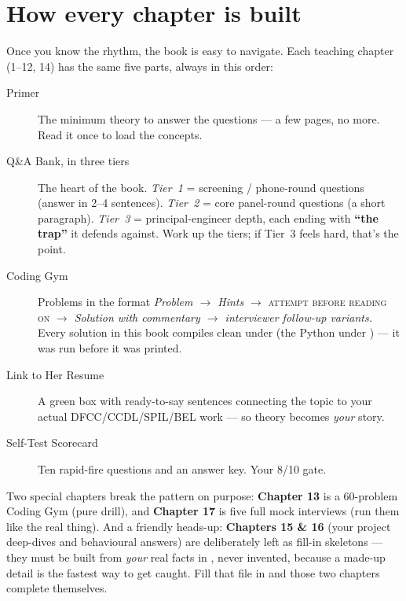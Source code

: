 \section*{How every chapter is built}
Once you know the rhythm, the book is easy to navigate. Each teaching chapter
(1--12, 14) has the same five parts, always in this order:

\begin{description}
\item[\textcolor{accent}{Primer}] The minimum theory to answer the questions ---
  a few pages, no more. Read it once to load the concepts.
\item[\textcolor{accent}{Q\&A Bank, in three tiers}] The heart of the book.
  \emph{Tier~1} = screening / phone-round questions (answer in 2--4 sentences).
  \emph{Tier~2} = core panel-round questions (a short paragraph). \emph{Tier~3}
  = principal-engineer depth, each ending with \textbf{``the trap''} it defends
  against. Work up the tiers; if Tier~3 feels hard, that's the point.
\item[\textcolor{accent}{Coding Gym}] Problems in the format \emph{Problem
  $\rightarrow$ Hints $\rightarrow$} \textsc{attempt before reading on}
  \emph{$\rightarrow$ Solution with commentary $\rightarrow$ interviewer
  follow-up variants.} Every solution in this book compiles clean under
   (the Python under ) --- it was
  run before it was printed.
\item[\textcolor{okgreen!70!black}{Link to Her Resume}] A green box with
  ready-to-say sentences connecting the topic to your actual DFCC/CCDL/SPIL/BEL
  work --- so theory becomes \emph{your} story.
\item[\textcolor{accent}{Self-Test Scorecard}] Ten rapid-fire questions and an
  answer key. Your 8/10 gate.
\end{description}

\noindent Two special chapters break the pattern on purpose: \textbf{Chapter 13}
is a 60-problem Coding Gym (pure drill), and \textbf{Chapter 17} is five full
mock interviews (run them like the real thing). And a friendly heads-up:
\textbf{Chapters 15 \& 16} (your project deep-dives and behavioural answers) are
deliberately left as fill-in skeletons --- they must be built from \emph{your}
real facts in , never invented, because a made-up detail
is the fastest way to get caught. Fill that file in and those two chapters
complete themselves.

